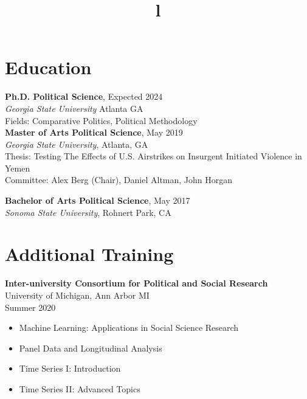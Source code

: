 \documentclass[margin]{res}
\newcommand{\fullhrulefill}{%
  \hspace*{-\sectionwidth}\hrulefill%
  }
\begin{document}
\begin{resume}


\fullhrulefill
\section{Education}
\textbf {Ph.D. Political Science}, Expected 2024 \\
{\sl Georgia State University} Atlanta GA \\
{Fields: Comparative Politics, Political Methodology} \\

\textbf{Master of Arts Political Science}, May 2019\\
{\sl Georgia State University}, Atlanta, GA\\
 Thesis: Testing The Effects of U.S. Airstrikes on Insurgent Initiated Violence in Yemen  \\
Committee: Alex Berg (Chair), Daniel Altman, John Horgan

\textbf{Bachelor of Arts Political Science}, May 2017 \\
{\sl Sonoma State University}, Rohnert Park, CA


\fullhrulefill
\section{Additional Training}
\textbf{Inter-university Consortium for Political and Social Research}\\ University of Michigan, Ann Arbor MI \\ Summer 2020
\begin{itemize}
	\item Machine Learning: Applications in Social Science Research
	\item Panel Data and Longitudinal Analysis
	\item Time Series I: Introduction
	\item Time Series II: Advanced Topics
\end{itemize}

\begin{format}
\title{l}\\
\\
\body\\
\end{format}
\fullhrulefill


\end{resume}
\end{document}
